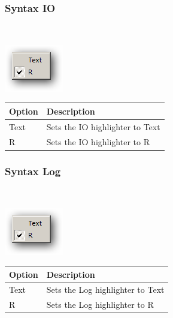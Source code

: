 \hypertarget{menu_view_r_rterm_syntax_IO}{}
\subsubsection{Syntax IO}\\

\includegraphics[scale=0.50]{./res/menu_r_rterm_syntax.png}\\

\begin{scriptsize}\begin{tabularx}{\textwidth}{>{\hsize=0.3\hsize}X>{\hsize=0.7\hsize}X}\\
    \hline
    \textbf{Option} & \textbf{Description} \\
    \hline
    Text & Sets the IO highlighter to Text \\
    R & Sets the IO highlighter to R \\
    \hline
  \end{tabularx}\end{scriptsize}


\hypertarget{menu_view_r_rterm_syntax_Log}{}
\subsubsection{Syntax Log}\\

\includegraphics[scale=0.50]{./res/menu_r_rterm_syntax.png}\\

\begin{scriptsize}\begin{tabularx}{\textwidth}{>{\hsize=0.3\hsize}X>{\hsize=0.7\hsize}X}\\
    \hline
    \textbf{Option} & \textbf{Description} \\
    \hline
    Text & Sets the Log highlighter to Text \\
    R & Sets the Log highlighter to R \\
    \hline
  \end{tabularx}\end{scriptsize}


